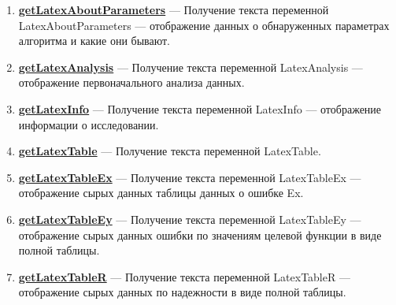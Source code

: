 \documentclass[a4paper,12pt]{article}
\begin{document}
\begin{enumerate}
\item \textbf{\hyperref[getLatexAboutParameters]{getLatexAboutParameters}} --- Получение текста переменной LatexAboutParameters --- отображение данных о обнаруженных параметрах алгоритма и какие они бывают.

\item \textbf{\hyperref[getLatexAnalysis]{getLatexAnalysis}} --- Получение текста переменной LatexAnalysis --- отображение первоначального анализа данных.

\item \textbf{\hyperref[getLatexInfo]{getLatexInfo}} --- Получение текста переменной LatexInfo --- отображение информации о исследовании.

\item \textbf{\hyperref[getLatexTable]{getLatexTable}} --- Получение текста переменной LatexTable.

\item \textbf{\hyperref[getLatexTableEx]{getLatexTableEx}} --- Получение текста переменной LatexTableEx --- отображение сырых данных таблицы данных о ошибке Ex.

\item \textbf{\hyperref[getLatexTableEy]{getLatexTableEy}} --- Получение текста переменной LatexTableEy --- отображение сырых данных ошибки по значениям целевой функции в виде полной таблицы.

\item \textbf{\hyperref[getLatexTableR]{getLatexTableR}} --- Получение текста переменной LatexTableR --- отображение сырых данных по надежности в виде полной таблицы.

\end{enumerate}
\end{document}
